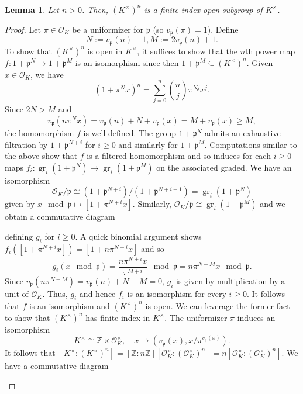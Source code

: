 \documentclass[11pt]{article}
\newcommand{\Z}{\mathbb{Z}}
\newcommand{\df}{\dfrac}
\newcommand{\iso}{\cong}
\newcommand{\mc}[1]{\mathcal{#1}}
\newcommand{\mf}[1]{\mathfrak{#1}}
\DeclareMathOperator{\gr}{gr} %
\renewcommand{\subset}{\subseteq}
\renewcommand{\O}{\mc{O}}
\newtheorem*{lemma*}{\\Lemma}
\begin{document}
\begin{lemma*}
Let $n>0$. Then, $(K^{\times})^n$ is a finite index open subgroup of $K^{\times}$.
\end{lemma*}
\begin{proof}
Let $\pi\in\O_K$ be a uniformizer for $\mf{p}$ (so $v_{\mf{p}}(\pi)=1$). Define 
$$N:=v_{\mf{p}}(n)+1,M:=2v_{\mf{p}}(n)+1.$$
To show that $(K^{\times})^n$ is open in $K^{\times}$, it suffices to show that the $n$th power map $f: 1+\mf{p}^N\to1+\mf{p}^M$ is an isomorphism since then $1+\mf{p}^M\subset(K^{\times})^n$. Given $x\in\O_K$, we have 
$$(1+\pi^Nx)^n=\sum_{j=0}^n\binom{n}{j}\pi^{Nj}x^j.$$
Since $2N>M$ and 
$$v_{\mf{p}}(n\pi^Nx)=v_{\mf{p}}(n)+N+v_{\mf{p}}(x)=M+v_{\mf{p}}(x)\geq M,$$
the homomorphism $f$ is well-defined. The group $1+\mf{p}^N$ admits an exhaustive filtration by $1+\mf{p}^{N+i}$ for $i\geq0$ and similarly for $1+\mf{p}^M$. Computations similar to the above show that $f$ is a filtered homomorphism and so induces for each $i\geq0$ maps $f_i: \gr_i(1+\mf{p}^N)\to\gr_i(1+\mf{p}^M)$ on the associated graded. We have an isomorphism 
$$\O_K/\mf{p}\iso(1+\mf{p}^{N+i})/(1+\mf{p}^{N+i+1})=\gr_i(1+\mf{p}^N)$$
given by $x\!\!\mod\mf{p}\mapsto[1+\pi^{N+i}x]$. Similarly, $\O_K/\mf{p}\iso\gr_i(1+\mf{p}^M)$ and we obtain a commutative diagram 
\begin{center}
\end{center}
defining $g_i$ for $i\geq0$. A quick binomial argument shows $f_i([1+\pi^{N+i}x])=[1+n\pi^{N+i}x]$ and so 
$$g_i(x\!\!\!\!\mod\mf{p})=\df{n\pi^{N+i}x}{\pi^{M+i}}\!\!\!\!\mod\mf{p}=n\pi^{N-M}x\!\!\!\!\mod\mf{p}.$$
Since $v_{\mf{p}}(n\pi^{N-M})=v_{\mf{p}}(n)+N-M=0$, $g_i$ is given by multiplication by a unit of $\O_K$. Thus, $g_i$ and hence $f_i$ is an isomorphism for every $i\geq0$. It follows that $f$ is an isomorphism and $(K^{\times})^n$ is open. We can leverage the former fact to show that $(K^{\times})^n$ has finite index in $K^{\times}$. The uniformizer $\pi$ induces an isomorphism
$$K^{\times}\iso\Z\times\O_K^{\times},\quad x\mapsto(v_{\mf{p}}(x),x/\pi^{v_{\mf{p}}(x)}).$$
It follows that $[K^{\times}:(K^{\times})^n]=[\Z:n\Z][\O_K^{\times}:(\O_K^{\times})^n]=n[\O_K^{\times}:(\O_K^{\times})^n]$. We have a commutative diagram 
\begin{center}

\end{center}
\end{proof}
\end{document}

